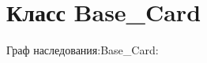\hypertarget{classBase__Card}{}\section{Класс Base\+\_\+\+Card}
\label{classBase__Card}


Граф наследования\+:Base\+\_\+\+Card\+:
